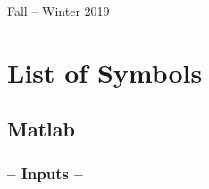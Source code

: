 \documentclass[11pt]{thesis}
\numberwithin{equation}{section}
\begin{document}
\begin{titlepage}
	\vfill\vfill

	\vfill
	{\large Fall -- Winter 2019} %
	

	
	 
	
\end{titlepage}
\tableofcontents
\newpage
\thispagestyle{fancy}
\chapter*{List of Symbols}
\section*{Matlab}
\subsection*{-- Inputs --}
\end{document}
